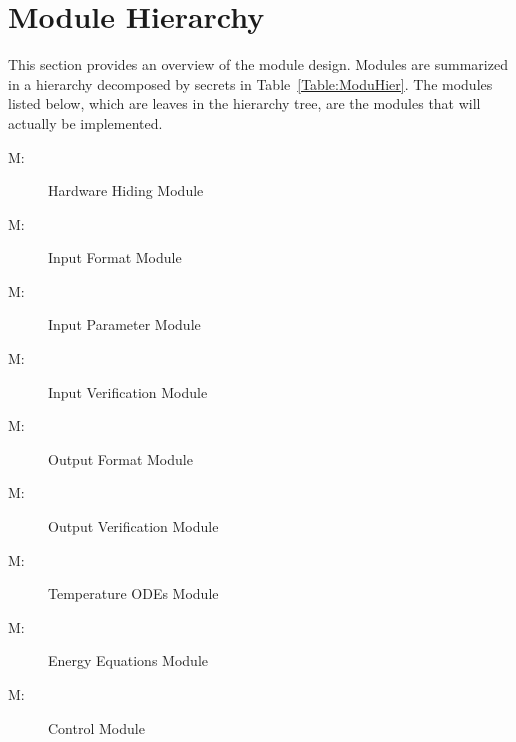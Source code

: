 \documentclass[12pt]{article}
\newcounter{modnum}
\newcommand{\mthemodnum}{M\themodnum}
\begin{document}
\section{Module Hierarchy}
\label{Sec:ModuHier}
This section provides an overview of the module design. Modules are summarized in a hierarchy decomposed by secrets in Table~\ref{Table:ModuHier}. The modules listed below, which are leaves in the hierarchy tree, are the modules that will actually be implemented.
\begin{description}
\item[\mthemodnum\label{MhwHiding}:]Hardware Hiding Module
\end{description}
\begin{description}
\item[\mthemodnum\label{MmodInputFormat}:]Input Format Module
\end{description}
\begin{description}
\item[\mthemodnum\label{MmodInputParam}:]Input Parameter Module
\end{description}
\begin{description}
\item[\mthemodnum\label{MmodInputVerif}:]Input Verification Module
\end{description}
\begin{description}
\item[\mthemodnum\label{Mmodoutputfdesc}:]Output Format Module
\end{description}
\begin{description}
\item[\mthemodnum\label{Mmodoutputvdesc}:]Output Verification Module
\end{description}
\begin{description}
\item[\mthemodnum\label{Mmodtempdesc}:]Temperature ODEs Module
\end{description}
\begin{description}
\item[\mthemodnum\label{Mmodenerdesc}:]Energy Equations Module
\end{description}
\begin{description}
\item[\mthemodnum\label{MmodControl}:]Control Module
\end{description}
\end{document}

